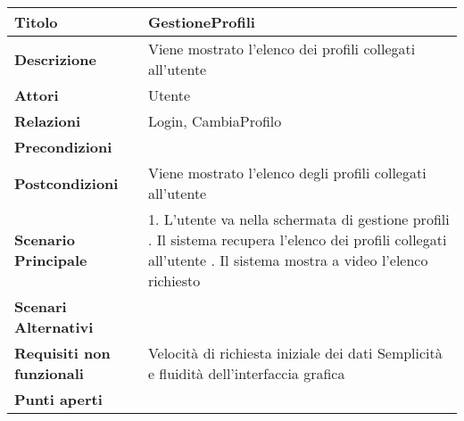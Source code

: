 \begin{tabular} {|P{4.5cm}|P{11cm}|}
  \hline
  \textbf{Titolo}                   & GestioneProfili                                               \\
  \hline
  \textbf{Descrizione}              & Viene mostrato l'elenco dei profili collegati all'utente      \\
  \hline
  \textbf{Attori}                   & Utente                                                        \\
  \hline
  \textbf{Relazioni}                & Login, CambiaProfilo                                          \\
  \hline
  \textbf{Precondizioni}            &                                                               \\
  \hline
  \textbf{Postcondizioni}           & Viene mostrato l'elenco degli profili collegati all'utente    \\
  \hline
  \textbf{Scenario Principale}      & 1. L'utente va nella schermata di gestione profili . Il sistema recupera l'elenco dei profili collegati all'utente . Il sistema mostra a video l'elenco richiesto                                                   \\
  \hline
  \textbf{Scenari Alternativi}      &                                                               \\
  \hline
  \textbf{Requisiti non funzionali} & Velocità di richiesta iniziale dei dati\linebreak
  Semplicità e fluidità dell'interfaccia grafica                                                    \\
  \hline
  \textbf{Punti aperti}             &                                                               \\
  \hline
\end{tabular}
\hfill
\break

